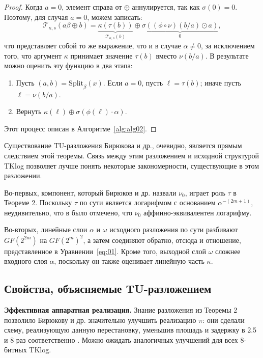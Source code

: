\begin{proof}
Когда \(a = 0\), элемент справа от \(\oplus\) аннулируется, так как \(\sigma(0) = 0\). Поэтому, для случая \(a = 0\), можем записать:
\[
  \mathscr{T}_{\kappa, s}(a \beta \oplus b)=\underbrace{\kappa(\tau(b))}_{\mathscr{T}_{\kappa, s}(b)} \oplus \underbrace{\sigma((\phi \circ \nu)(b / a) \odot a)}_0,
\]
что представляет собой то же выражение, что и в случае \(\alpha \neq 0\), за исключением того, что аргумент \(\kappa\) принимает значение \(\tau(b)\) вместо \(\nu(b/a)\). В результате можно оценить эту функцию в два этапа:

\begin{enumerate}
  \item Пусть \((a, b) = \mathrm{Split}_{\beta}(x)\). Если \(a = 0\), пусть \(\ell = \tau(b)\); иначе пусть \(\ell = \nu(b/a)\).
  \item Вернуть \(\kappa(\ell) \oplus \sigma(\phi(\ell) \cdot \alpha)\).
\end{enumerate}

Этот процесс описан в Алгоритме~\ref{alg:alg02}.
\end{proof}

Существование TU-разложения Бирюкова и др., очевидно, является прямым следствием этой теоремы. Связь между этим разложением и исходной структурой TKlog позволяет лучше понять некоторые закономерности, существующие в этом разложении.

Во-первых, компонент, который Бирюков и др. назвали \(\nu_0\), играет роль \(\tau\) в Теореме 2. Поскольку \(\tau\) по сути является логарифмом с основанием \(\alpha^{-(2m+1)}\), неудивительно, что в \cite{PU16} было отмечено, что \(\nu_0\) аффинно-эквивалентен логарифму.

Во-вторых, линейные слои \(\alpha\) и \(\omega\) исходного разложения по сути разбивают \(GF(2^{2m})\) на \(GF(2^m)^2\), а затем соединяют обратно, отсюда и отношение, представленное в Уравнении~\ref{eq:01}. Кроме того, выходной слой \(\omega\) сложнее входного слоя \(\alpha\), поскольку он также оценивает линейную часть \(\kappa\).

\subsection{Свойства, объясняемые TU-разложением}

\textbf{Эффективная аппаратная реализация.} Знание разложения из Теоремы 2 позволило Бирюкову и др. значительно улучшить реализацию \(\pi\): они сделали схему, реализующую данную перестановку, уменьшив площадь и задержку в 2.5 и 8 раз соответственно \cite{BPU16b}. Можно ожидать аналогичных улучшений для всех 8-битных TKlog.

